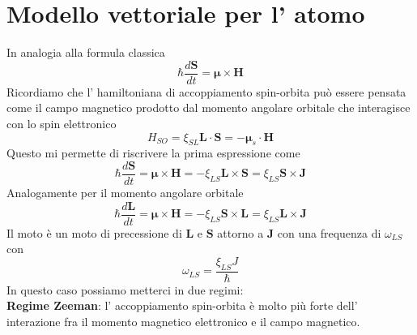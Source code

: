 \section{Modello vettoriale per l' atomo}
In analogia alla formula classica 
\begin{equation*}
  \hbar \frac{d \bm{S}}{dt} = \bm{\mu} \times \bm{H}
\end{equation*}
Ricordiamo che l' hamiltoniana di accoppiamento spin-orbita può essere pensata come il campo magnetico prodotto dal momento angolare orbitale che interagisce con lo spin elettronico
\begin{equation*}
  H_{SO} = \xi_{SL} \bm{L}\cdot \bm{S} = -\bm{\mu}_s\cdot \bm{H}
\end{equation*}
Questo mi permette di riscrivere la prima espressione come
\begin{equation*}
  \hbar \frac{d \bm{S}}{dt} = \bm{\mu} \times \bm{H} = -\xi_{LS} \bm{L}\times \bm{S} = \xi_{LS} \bm{S}\times \bm{J}
\end{equation*}
Analogamente per il momento angolare orbitale
\begin{equation*}
  \hbar \frac{d \bm{L}}{dt} = \bm{\mu} \times \bm{H} = -\xi_{LS} \bm{S}\times \bm{L} = \xi_{LS} \bm{L}\times \bm{J}
\end{equation*}
Il moto è un moto di precessione di $\bm{L}$ e $\bm{S}$ attorno a $\bm{J}$ con una frequenza di $\omega_{LS}$ con 
\begin{equation*}
  \omega_{LS} = \frac{\xi_{LS}J}{\hbar}
\end{equation*}
In questo caso possiamo metterci in due regimi:
\\
\textbf{Regime Zeeman}: l' accoppiamento spin-orbita è molto più forte dell' interazione fra il momento magnetico elettronico e il campo magnetico.

